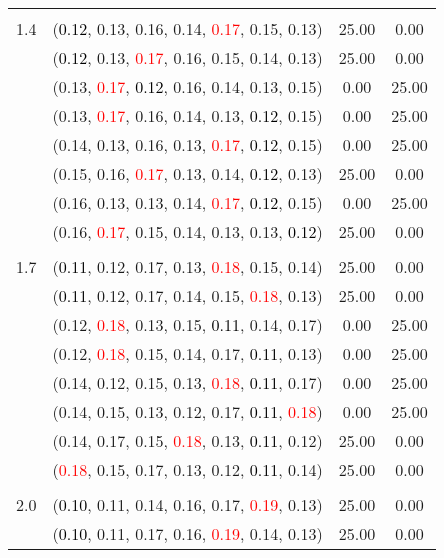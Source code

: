 \documentclass[10pt,a4paper]{report}
\begin{document}
\begin{center}
\begin{longtable}{clcc}
		&&&\\
		1.4			&(\textcolor{black}{0.12}, 0.13, 0.16, 0.14, \textcolor{red}{0.17}, 0.15, 0.13)&25.00&0.00\\
			&(\textcolor{black}{0.12}, 0.13, \textcolor{red}{0.17}, 0.16, 0.15, 0.14, 0.13)&25.00&0.00\\
			&(0.13, \textcolor{red}{0.17}, \textcolor{black}{0.12}, 0.16, 0.14, 0.13, 0.15)&0.00&25.00\\
			&(0.13, \textcolor{red}{0.17}, 0.16, 0.14, 0.13, \textcolor{black}{0.12}, 0.15)&0.00&25.00\\
			&(0.14, 0.13, 0.16, 0.13, \textcolor{red}{0.17}, \textcolor{black}{0.12}, 0.15)&0.00&25.00\\
			&(0.15, 0.16, \textcolor{red}{0.17}, 0.13, 0.14, \textcolor{black}{0.12}, 0.13)&25.00&0.00\\
			&(0.16, 0.13, 0.13, 0.14, \textcolor{red}{0.17}, \textcolor{black}{0.12}, 0.15)&0.00&25.00\\
			&(0.16, \textcolor{red}{0.17}, 0.15, 0.14, 0.13, 0.13, \textcolor{black}{0.12})&25.00&0.00\\
		&&&\\
		1.7			&(\textcolor{black}{0.11}, 0.12, 0.17, 0.13, \textcolor{red}{0.18}, 0.15, 0.14)&25.00&0.00\\
			&(\textcolor{black}{0.11}, 0.12, 0.17, 0.14, 0.15, \textcolor{red}{0.18}, 0.13)&25.00&0.00\\
			&(0.12, \textcolor{red}{0.18}, 0.13, 0.15, \textcolor{black}{0.11}, 0.14, 0.17)&0.00&25.00\\
			&(0.12, \textcolor{red}{0.18}, 0.15, 0.14, 0.17, \textcolor{black}{0.11}, 0.13)&0.00&25.00\\
			&(0.14, 0.12, 0.15, 0.13, \textcolor{red}{0.18}, \textcolor{black}{0.11}, 0.17)&0.00&25.00\\
			&(0.14, 0.15, 0.13, 0.12, 0.17, \textcolor{black}{0.11}, \textcolor{red}{0.18})&0.00&25.00\\
			&(0.14, 0.17, 0.15, \textcolor{red}{0.18}, 0.13, \textcolor{black}{0.11}, 0.12)&25.00&0.00\\
			&(\textcolor{red}{0.18}, 0.15, 0.17, 0.13, 0.12, \textcolor{black}{0.11}, 0.14)&25.00&0.00\\
		&&&\\
		2.0			&(\textcolor{black}{0.10}, 0.11, 0.14, 0.16, 0.17, \textcolor{red}{0.19}, 0.13)&25.00&0.00\\
			&(\textcolor{black}{0.10}, 0.11, 0.17, 0.16, \textcolor{red}{0.19}, 0.14, 0.13)&25.00&0.00\\

\end{longtable}
\end{center}
\end{document}
